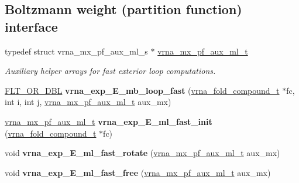 \subsection*{Boltzmann weight (partition function) interface}
\begin{DoxyCompactItemize}
\item 
typedef struct vrna\+\_\+mx\+\_\+pf\+\_\+aux\+\_\+ml\+\_\+s $\ast$ \hyperlink{group__eval__loops__mb_ga39a8cc1385dcb542a60a9393cde6a1e3}{vrna\+\_\+mx\+\_\+pf\+\_\+aux\+\_\+ml\+\_\+t}
\begin{DoxyCompactList}\small\item\em Auxiliary helper arrays for fast exterior loop computations. \end{DoxyCompactList}\item 
\mbox{\label{group__eval__loops__mb_gac4a6acc1fded0e89460692ef9f62a6c2}} 
\hyperlink{group__data__structures_ga31125aeace516926bf7f251f759b6126}{F\+L\+T\+\_\+\+O\+R\+\_\+\+D\+BL} {\bfseries vrna\+\_\+exp\+\_\+\+E\+\_\+mb\+\_\+loop\+\_\+fast} (\hyperlink{group__fold__compound_ga1b0cef17fd40466cef5968eaeeff6166}{vrna\+\_\+fold\+\_\+compound\+\_\+t} $\ast$fc, int i, int j, \hyperlink{group__eval__loops__mb_ga39a8cc1385dcb542a60a9393cde6a1e3}{vrna\+\_\+mx\+\_\+pf\+\_\+aux\+\_\+ml\+\_\+t} aux\+\_\+mx)
\item 
\mbox{\label{group__eval__loops__mb_gab4ec400cb861b8102ca9974406d9de9b}} 
\hyperlink{group__eval__loops__mb_ga39a8cc1385dcb542a60a9393cde6a1e3}{vrna\+\_\+mx\+\_\+pf\+\_\+aux\+\_\+ml\+\_\+t} {\bfseries vrna\+\_\+exp\+\_\+\+E\+\_\+ml\+\_\+fast\+\_\+init} (\hyperlink{group__fold__compound_ga1b0cef17fd40466cef5968eaeeff6166}{vrna\+\_\+fold\+\_\+compound\+\_\+t} $\ast$fc)
\item 
\mbox{\label{group__eval__loops__mb_gabc73c029027ba09bfe70e2318052f0ae}} 
void {\bfseries vrna\+\_\+exp\+\_\+\+E\+\_\+ml\+\_\+fast\+\_\+rotate} (\hyperlink{group__eval__loops__mb_ga39a8cc1385dcb542a60a9393cde6a1e3}{vrna\+\_\+mx\+\_\+pf\+\_\+aux\+\_\+ml\+\_\+t} aux\+\_\+mx)
\item 
\mbox{\label{group__eval__loops__mb_ga3bbc24b3950867b039104ce8b4f39346}} 
void {\bfseries vrna\+\_\+exp\+\_\+\+E\+\_\+ml\+\_\+fast\+\_\+free} (\hyperlink{group__eval__loops__mb_ga39a8cc1385dcb542a60a9393cde6a1e3}{vrna\+\_\+mx\+\_\+pf\+\_\+aux\+\_\+ml\+\_\+t} aux\+\_\+mx)

\end{DoxyCompactItemize}

